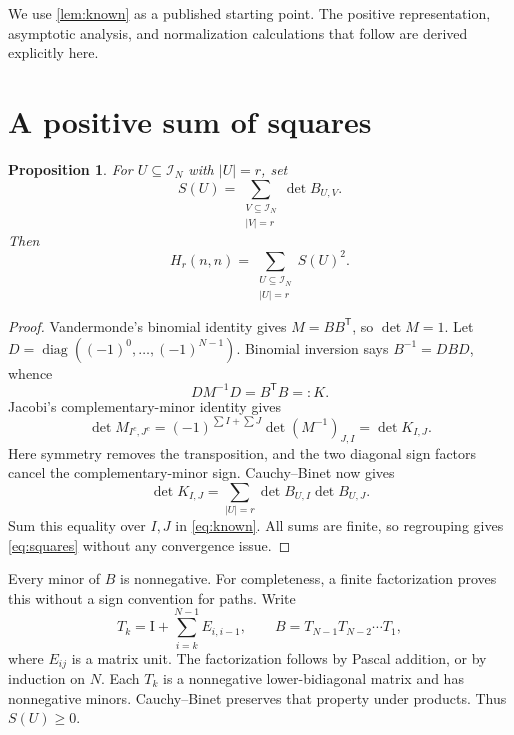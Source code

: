 \documentclass[11pt]{article}
\numberwithin{equation}{section}
\newtheorem{proposition}[proposition]{Proposition}
\theoremstyle{definition}
\newcommand{\Id}{\mathrm{I}}
\newcommand{\diag}{\operatorname{diag}}
\begin{document}
We use \cref{lem:known} as a published starting point. The positive representation, asymptotic analysis, and normalization calculations that follow are derived explicitly here.

\section{A positive sum of squares}\label{sec:positive}

\begin{proposition}\label{prop:squares}
For $U\subseteq\mathcal I_N$ with $|U|=r$, set
\begin{equation}\label{eq:S}
 S(U)=\sum_{\substack{V\subseteq\mathcal I_N\\|V|=r}}\det B_{U,V}.
\end{equation}
Then
\begin{equation}\label{eq:squares}
 \boxed{\displaystyle H_r(n,n)=\sum_{\substack{U\subseteq\mathcal I_N\\|U|=r}}S(U)^2.}
\end{equation}
\end{proposition}

\begin{proof}
Vandermonde's binomial identity gives $M=BB^{\mathsf T}$, so $\det M=1$. Let
$D=\diag((-1)^0,\ldots,(-1)^{N-1})$. Binomial inversion says $B^{-1}=DBD$, whence
\begin{equation}\label{eq:inverse}
 D M^{-1}D=B^{\mathsf T}B=:K.
\end{equation}
Jacobi's complementary-minor identity gives
\[
 \det M_{I^c,J^c}=(-1)^{\sum I+\sum J}\det (M^{-1})_{J,I}
                 =\det K_{I,J}.
\]
Here symmetry removes the transposition, and the two diagonal sign factors cancel the complementary-minor sign. Cauchy--Binet now gives
\[
 \det K_{I,J}=\sum_{|U|=r}\det B_{U,I}\det B_{U,J}.
\]
Sum this equality over $I,J$ in \eqref{eq:known}. All sums are finite, so regrouping gives \eqref{eq:squares} without any convergence issue.
\end{proof}

Every minor of $B$ is nonnegative. For completeness, a finite factorization proves this without a sign convention for paths. Write
\[
 T_k=\Id+\sum_{i=k}^{N-1}E_{i,i-1},\qquad
 B=T_{N-1}T_{N-2}\cdots T_1,
\]
where $E_{ij}$ is a matrix unit. The factorization follows by Pascal addition, or by induction on $N$. Each $T_k$ is a nonnegative lower-bidiagonal matrix and has nonnegative minors. Cauchy--Binet preserves that property under products. Thus $S(U)\geq0$.
\end{document}
